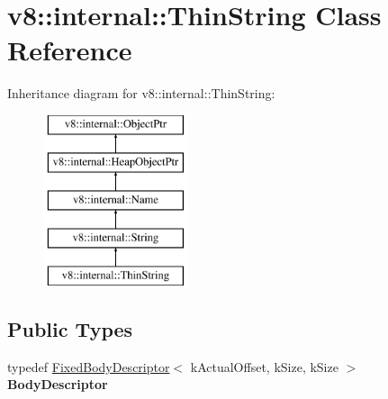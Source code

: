 \hypertarget{classv8_1_1internal_1_1ThinString}{}\section{v8\+:\+:internal\+:\+:Thin\+String Class Reference}
\label{classv8_1_1internal_1_1ThinString}
Inheritance diagram for v8\+:\+:internal\+:\+:Thin\+String\+:\begin{figure}[H]
\begin{center}
\leavevmode
\includegraphics[height=5.000000cm]{classv8_1_1internal_1_1ThinString}
\end{center}
\end{figure}
\subsection*{Public Types}
\begin{DoxyCompactItemize}
\item 
\mbox{\label{classv8_1_1internal_1_1ThinString_a75252d3af894c96ebfa7d3e49bcc9851}} 
typedef \mbox{\hyperlink{classv8_1_1internal_1_1FixedBodyDescriptor}{Fixed\+Body\+Descriptor}}$<$ k\+Actual\+Offset, k\+Size, k\+Size $>$ {\bfseries Body\+Descriptor}
\end{DoxyCompactItemize}
